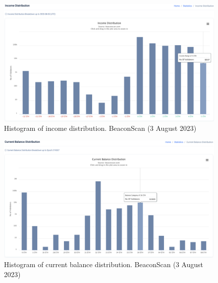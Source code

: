\documentclass[UTF8]{article}
\begin{document}
\begin{figure}[htbp]
\begin{center}
\includegraphics[width=\linewidth]{images/beaconscan14}
\caption{Histogram of income distribution. BeaconScan (3 August 2023)}
\label{fig:beaconscan14}
\end{center}
\end{figure}

\begin{figure}[htbp]
\begin{center}
\includegraphics[width=\linewidth]{images/beaconscan15}
\caption{Histogram of current balance distribution. BeaconScan (3 August 2023)}
\label{fig:beaconscan15}
\end{center}
\end{figure}
\end{document}
